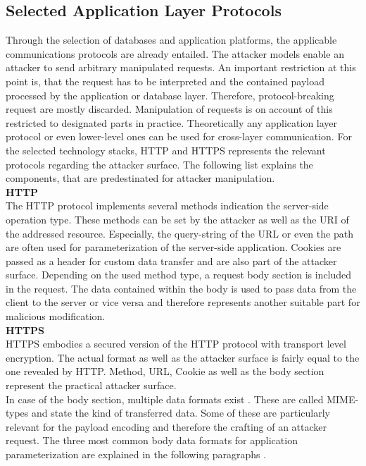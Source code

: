 \subsection{Selected Application Layer Protocols}
\label{sec:selectedAppLayerProtocols}
Through the selection of databases and application platforms, the applicable communications protocols are already entailed. The attacker models enable an attacker to send arbitrary manipulated requests. An important restriction at this point is, that the request has to be interpreted and the contained payload processed by the application or database layer. Therefore, protocol-breaking request are mostly discarded. Manipulation of requests is on account of this restricted to designated parts in practice. Theoretically any application layer protocol or even lower-level ones can be used for cross-layer communication. For the selected technology stacks, HTTP and HTTPS represents the relevant protocols regarding the attacker surface. The following list explains the components, that are predestinated for attacker manipulation. \\

\textbf{HTTP}\\
The HTTP protocol implements several methods indication the server-side operation type. These methods can be set by the attacker as well as the URI of the addressed resource. Especially, the query-string of the URL or even the path are often used for parameterization of the server-side application. Cookies are passed as a header for custom data transfer and are also part of the attacker surface. Depending on the used method type, a request body section is included in the request. The data contained within the body is used to pass data from the client to the server or vice versa and therefore represents another suitable part for malicious modification. \\

\textbf{HTTPS}\\
HTTPS embodies a secured version of the HTTP protocol with transport level encryption. The actual format as well as the attacker surface is fairly equal to the one revealed by HTTP. Method, URL, Cookie as well as the body section represent the practical attacker surface. \\

In case of the body section, multiple data formats exist \cite{Freed1996a}. These are called MIME-types and state the kind of transferred data. Some of these are particularly relevant for the payload encoding and therefore the crafting of an attacker request. The three most common body data formats for application parameterization are explained in the following paragraphs \cite{Freed2016}.\\

